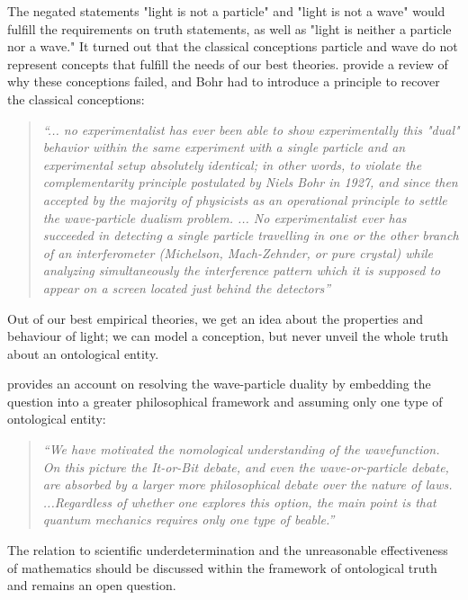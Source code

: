 \documentclass{article}
\begin{document}
The negated statements "light is not a particle" and "light is not a wave" would fulfill the requirements on truth statements, as well as "light is neither a particle nor a wave." It turned out that the classical conceptions particle and wave do not represent concepts that fulfill the needs of our best theories. \cite[p.1403-p.1404]{rauchcombourieu1992wave} provide a review of why these conceptions failed, and Bohr had to introduce a principle to recover the classical conceptions:

\begin{quote}
\textit{``... no experimentalist has ever been able to show experimentally this "dual" behavior within the same experiment with a single particle and an
experimental setup absolutely identical; in other words, to violate the complementarity principle postulated by Niels Bohr in 1927, and since then accepted by the majority of physicists as an operational principle to settle the wave-particle dualism problem.
...
No experimentalist ever has succeeded in detecting a single particle travelling in one or the other branch of an interferometer (Michelson, Mach-Zehnder, or pure crystal) while analyzing simultaneously the interference pattern which it is supposed to appear on a screen located just behind the detectors''}
\end{quote}

Out of our best empirical theories, we get an idea about the properties and behaviour of light; we can model a conception, but never unveil the whole truth about an ontological entity. 

\cite[]{callender2015one} provides an account on resolving the wave-particle duality by embedding the question into a greater philosophical framework and assuming only one type of ontological entity:

\begin{quote}
\textit{``We have motivated the nomological understanding of the wavefunction. On this picture the It-or-Bit debate, and even the wave-or-particle debate, are absorbed by a larger more philosophical debate over the nature of laws.
...Regardless of whether one explores this option, the main point is
that quantum mechanics requires only one type of beable.''}
\end{quote}


The relation to scientific underdetermination and the unreasonable effectiveness of mathematics should be discussed within the framework of ontological truth and remains an open question. \newline
\end{document}
